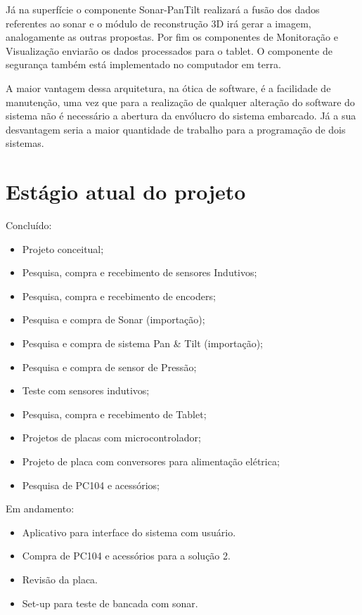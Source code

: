 Já na superfície o componente Sonar-PanTilt realizará a fusão dos dados
referentes ao sonar e o módulo de reconstrução 3D irá gerar a imagem,
analogamente as outras propostas. Por fim os componentes de Monitoração e
Visualização enviarão os dados processados para o tablet. O componente de
segurança também está implementado no computador em terra.

A maior vantagem dessa arquitetura, na ótica de software, é a facilidade de
manutenção, uma vez que para a realização de qualquer alteração do software do
sistema não é necessário a abertura da envólucro do sistema embarcado. Já a sua
desvantagem seria a maior quantidade de trabalho para a programação de dois
sistemas.

\section{Estágio atual do projeto}

Concluído:
\begin{itemize}
  \item Projeto conceitual;
  \item Pesquisa, compra e recebimento de sensores Indutivos;
  \item Pesquisa, compra e recebimento de encoders;
  \item Pesquisa e compra de Sonar (importação);
  \item Pesquisa e compra de sistema Pan \& Tilt (importação);
  \item Pesquisa e compra de sensor de Pressão;
  \item Teste com sensores indutivos;
  \item Pesquisa, compra e recebimento de Tablet;
  \item Projetos de placas com microcontrolador;
  \item Projeto de placa com conversores para alimentação elétrica;
  \item Pesquisa de PC104 e acessórios;   
\end{itemize}
Em andamento:
\begin{itemize}
  \item Aplicativo para interface do sistema com usuário.
  \item Compra de PC104 e acessórios para a solução 2.
  \item Revisão da placa.
  \item Set-up para teste de bancada com sonar.
\end{itemize}
